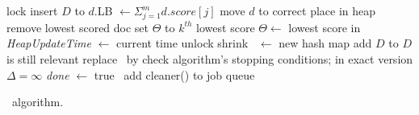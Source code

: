 \begin{algorithm*}[tbh]
\begin{multicols}{2}
\begin{algorithmic}[1]
\Statex


{} 
\State lock \DHeap \label{l:lock-heap}
	\State insert $D$ to \DHeap
	  \label{l:for-all-heap-docs}
		\State $d$.LB $\leftarrow \Sigma_{j=1}^{m} d.score[j]$
		\State move $d$ to correct place in heap \label{l:fix-heap}
	\EndFor
		\State remove lowest scored doc %
	\EndIf
		 \Comment set $\Theta$ to $k^{th}$ lowest score
		\State  $\Theta \leftarrow$ lowest score in \DHeap
	\EndIf
	\State \emph{HeapUpdateTime} $\leftarrow$ current time 
\EndIf
\State unlock \DHeap  \label{l:unlock-heap}
\EndProcedure
%
%
\Statex 
\Statex
{} \label{l:clean-start}
\If{$|\DMap | > \Phi $} 
 \Comment shrink \DMap 
\State \LDMap\ $\leftarrow$ new hash map \label{l:clean-local-copy}
{} 
	\State add   $D$ to \LDMap \Comment $D$ is still relevant
\EndIf
\EndFor
\State replace \DMap\ by \LDMap \label{l:clean-replace}
\EndIf
\Statex
\Statex \Comment check algorithm's stopping conditions; in exact version $\Delta=\infty$
 \label{l:clean-stop-cond}
\State \emph{done} $\leftarrow$ true
\Else\ add {\sc cleaner()} to job queue
\EndIf
\label{l:clean-end}
\EndProcedure 
\Statex
\end{algorithmic}
\end{multicols}
\caption{\alg\ algorithm.}
\label{alg:sparta}
\end{algorithm*}